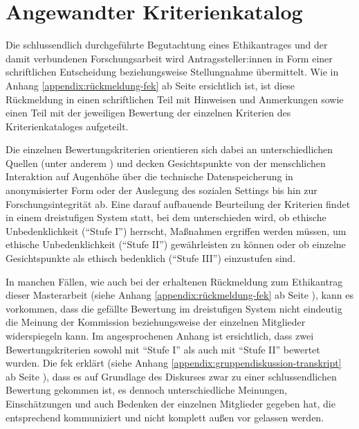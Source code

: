 \documentclass[a4paper,12pt,twoside]{scrreprt}
\begin{document}
\section{Angewandter Kriterienkatalog}
\label{sec:angewandter-kriterienkatalog}

Die schlussendlich durchgeführte Begutachtung eines Ethikantrages und der damit verbundenen Forschungsarbeit wird Antragssteller:innen in Form einer schriftlichen Entscheidung beziehungsweise Stellungnahme übermittelt. \cite[4]{forschungsethik-kommission_der_fachhochschule_vorarlberg_verfahrensordnung_2020} Wie in Anhang \ref{appendix:rückmeldung-fek} ab Seite \pageref{appendix:rückmeldung-fek} ersichtlich ist, ist diese Rückmeldung in einen schriftlichen Teil mit Hinweisen und Anmerkungen sowie einen Teil mit der jeweiligen Bewertung der einzelnen Kriterien des Kriterienkataloges aufgeteilt.

Die einzelnen Bewertungskriterien orientieren sich dabei an unterschiedlichen Quellen (unter anderem \cite{manzeschke_meestar_2015, marckmann_was_2000, schuchter_care_2018}) und decken Gesichtspunkte von der menschlichen Interaktion auf Augenhöhe über die technische Datenspeicherung in anonymisierter Form oder der Auslegung des sozialen Settings bis hin zur Forschungsintegrität ab. Eine darauf aufbauende Beurteilung der Kriterien findet in einem dreistufigen System statt, bei dem unterschieden wird, ob ethische Unbedenklichkeit (\enquote{Stufe I}) herrscht, Maßnahmen ergriffen werden müssen, um ethische Unbedenklichkeit (\enquote{Stufe II}) gewährleisten zu können oder ob einzelne Gesichtspunkte als ethisch bedenklich (\enquote{Stufe III}) einzustufen sind. \cite[1]{forschungsethik-kommission_der_fachhochschule_vorarlberg_kriterienkatalog_2021}

\medskip

In manchen Fällen, wie auch bei der erhaltenen Rückmeldung zum Ethikantrag dieser Masterarbeit (siehe Anhang \ref{appendix:rückmeldung-fek} ab Seite \pageref{appendix:rückmeldung-fek}), kann es vorkommen, dass die gefällte Bewertung im dreistufigen System nicht eindeutig die Meinung der Kommission beziehungsweise der einzelnen Mitglieder widerspiegeln kann. Im angesprochenen Anhang ist ersichtlich, dass zwei Bewertungskriterien sowohl mit \enquote{Stufe I} als auch mit \enquote{Stufe II} bewertet wurden. Die \ac{fek} erklärt (siehe Anhang \ref{appendix:gruppendiskussion-transkript} ab Seite \pageref{appendix:gruppendiskussion-transkript}), dass es auf Grundlage des Diskurses zwar zu einer schlussendlichen Bewertung gekommen ist, es dennoch unterschiedliche Meinungen, Einschätzungen und auch Bedenken der einzelnen Mitglieder gegeben hat, die entsprechend kommuniziert und nicht komplett außen vor gelassen werden.
\end{document}
